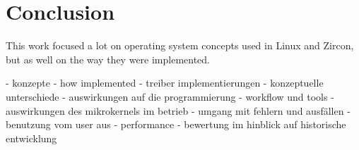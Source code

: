 
\chapter{Conclusion} \label{ch:conclusion}
This work focused a lot on operating system concepts used in Linux and Zircon, but as well on the way they were implemented.


- konzepte
    - how implemented
- treiber implementierungen
    - konzeptuelle unterschiede
    - auswirkungen auf die programmierung
    - workflow und tools
- auswirkungen des mikrokernels im betrieb
    - umgang mit fehlern und ausfällen
    - benutzung vom user aus
- performance
- bewertung im hinblick auf historische entwicklung

